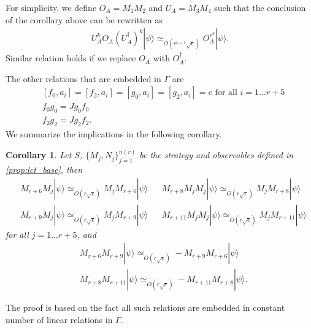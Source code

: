\documentclass[11pt,letterpaper]{article}
\newcommand{\ket}[1]{|#1\rangle}
\newcommand{\ct}{^{\dagger}}
\newcommand{\1}{\mathbb{1}}
\newcommand{\nr}{n(r)}
\newcommand{\se}{\sqrt{\epsilon}}
\newcommand{\appd}[1]{\simeq_{#1}}
\newtheorem{corollary}[theorem]{Corollary}
\theoremstyle{definition}
\begin{document}
For simplicity, we define $O_A = M_1M_2$ and $U_A=M_3M_4$ such that
the conclusion of the corollary above can be rewritten as 
\begin{align}
	U_A^k O_A (U_A\ct)^k \ket{\psi} \appd{O(r^{k+1} \se)} O_A^{r^k} \ket{\psi}.
\end{align}
Similar relation holds if we replace $O_A$ with $O_A\ct$.

The other relations that are embedded in $\Gamma$ are 
\begin{align}
	&[f_0, a_i] = [f_2, a_i] = [g_0, a_i] = [g_2, a_i] = e \text{ for all } i = 1 \dots r+5 \\
	&f_0g_0 = Jg_0f_0 \\
	&f_2g_2 = J g_2 f_2.
\end{align}
We summarize the implications in the following corollary.
\begin{corollary}
	Let $S$, $\{M_j, N_j\}_{j=1}^{\nr}$ be the strategy and observables defined in \cref{prop:lct_base},
	then
	\begin{align}
		&M_{r+6} M_j \ket{\psi} \appd{O(r\se)} M_j M_{r+6} \ket{\psi} && 
		M_{r+8}M_jM_j \ket{\psi} \appd{O(r\se)} M_j M_{r+8} \ket{\psi} \\
		&M_{r+9} M_j \ket{\psi} \appd{O(r\se)} M_j M_{r+9} \ket{\psi} && 
		M_{r+11}M_jM_j \ket{\psi} \appd{O(r\se)} M_j M_{r+11} \ket{\psi} 
	\end{align}
	for all $j = 1 \dots r+5$, and
	\begin{align}
		&M_{r+6}M_{r+9} \ket{\psi} \appd{O(r\se)} - M_{r+9}M_{r+6} \ket{\psi} \\
		&M_{r+8}M_{r+11} \ket{\psi} \appd{O(r\se)} -M_{r+11}M_{r+8} \ket{\psi}.
	\end{align}
\end{corollary}
The proof is based on the fact all such relations are embedded in constant number of linear relations in $\Gamma$.
\end{document}
